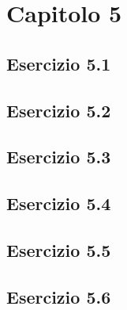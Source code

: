 \section{Capitolo 5}
\subsection{Esercizio 5.1}

\subsection{Esercizio 5.2}

\subsection{Esercizio 5.3}

\subsection{Esercizio 5.4}

\subsection{Esercizio 5.5}

\subsection{Esercizio 5.6}

